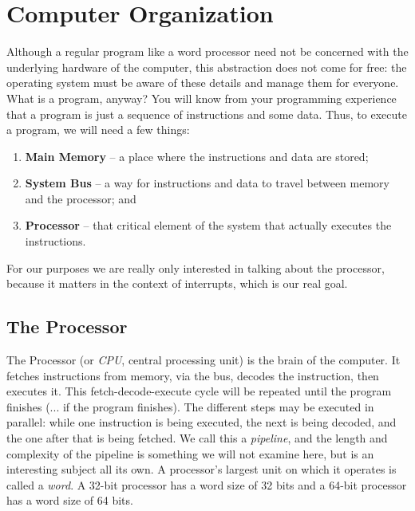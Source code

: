 




\section*{Computer Organization}
Although a regular program like a word processor need not be concerned with the underlying hardware of the computer, this abstraction does not come for free: the operating system must be aware of these details and manage them for everyone. What is a program, anyway? You will know from your programming experience that a program is just a sequence of instructions and some data. Thus, to execute a program, we will need a few things:

\begin{enumerate}
	\item \textbf{Main Memory} -- a place where the instructions and data are stored;
	\item \textbf{System Bus} -- a way for instructions and data to travel between memory and the processor; and
	\item \textbf{Processor} -- that critical element of the system that actually executes the instructions.
\end{enumerate}

For our purposes we are really only interested in talking about the processor, because it matters in the context of interrupts, which is our real goal.

\subsection*{The Processor}

The Processor (or \textit{CPU}, central processing unit) is the brain of the computer. It fetches instructions from memory, via the bus, decodes the instruction, then executes it. This fetch-decode-execute cycle will be repeated until the program finishes (... if the program finishes). The different steps may be executed in parallel: while one instruction is being executed, the next is being decoded, and the one after that is being fetched. We call this a \textit{pipeline}, and the length and complexity of the pipeline is something we will not examine here, but is an interesting subject all its own. A processor's largest unit on which it operates is called a \textit{word}. A 32-bit processor has a word size of 32 bits and a 64-bit processor has a word size of 64 bits.

